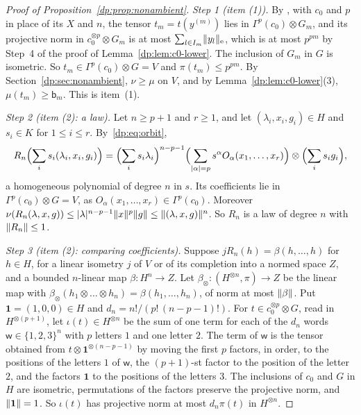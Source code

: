 \begin{proof}[Proof of Proposition~\ref{dp:prop:nonambient}]
\emph{Step 1 (item (1)).} By \cite[Lemma~Q.7(1)]{I}, with $c_0$ and $p$ in place of its $X$ and $n$, the tensor $t_m=t(y^{(m)})$ lies in $\Gamma^p(c_0)\otimes G_m$, and its projective norm in $c_0^{\otimes p}\otimes G_m$ is at most $\sum_{l\in I_m}\lVert y_l\rVert_{\rm e}$, which is at most $p^{pm}$ by Step~4 of the proof of Lemma~\ref{dp:lem:c0-lower}. The inclusion of $G_m$ in $G$ is isometric. So $t_m\in\Gamma^p(c_0)\otimes G=V$ and $\pi(t_m)\le p^{pm}$. By Section~\ref{dp:sec:nonambient}, $\nu\ge\mu$ on $V$, and by Lemma~\ref{dp:lem:c0-lower}(3), $\mu(t_m)\ge\mathsf b_m$. This is item~(1).

\emph{Step 2 (item (2): a law).} Let $n\ge p+1$ and $r\ge1$, and let $(\lambda_i,x_i,g_i)\in H$ and $s_i\in K$ for $1\le i\le r$. By~\eqref{dp:eq:orbit},
\[
 R_n\Bigl(\sum_is_i(\lambda_i,x_i,g_i)\Bigr)=\Bigl(\sum_is_i\lambda_i\Bigr)^{n-p-1}\Bigl(\sum_{\lvert \alpha\rvert=p}s^\alpha O_\alpha(x_1,\dots,x_r)\Bigr)\otimes\Bigl(\sum_is_ig_i\Bigr),
\]
a homogeneous polynomial of degree $n$ in $s$. Its coefficients lie in $\Gamma^p(c_0)\otimes G=V$, as $O_\alpha(x_1,\dots,x_r)\in\Gamma^p(c_0)$. Moreover $\nu(R_n(\lambda,x,g))\le\lvert \lambda\rvert^{n-p-1}\lVert x\rVert^p\lVert g\rVert\le\lVert (\lambda,x,g)\rVert^n$. So $R_n$ is a law of degree $n$ with $\lVert R_n\rVert\le1$.

\emph{Step 3 (item (2): comparing coefficients).} Suppose $jR_n(h)=\beta(h,\dots,h)$ for $h\in H$, for a linear isometry $j$ of $V$ or of its completion into a normed space $Z$, and a bounded $n$\nobreakdash-linear map $\beta\colon H^n\to Z$. Let $\beta_\otimes\colon(H^{\otimes n},\pi)\to Z$ be the linear map with $\beta_\otimes(h_1\otimes\dots\otimes h_n)=\beta(h_1,\dots,h_n)$, of norm at most $\lVert \beta\rVert$. Put $\mathbf 1=(1,0,0)\in H$ and $d_n=n!/(p!\,(n-p-1)!)$. For $t\in c_0^{\otimes p}\otimes G$, read in $H^{\otimes(p+1)}$, let $\iota(t)\in H^{\otimes n}$ be the sum of one term for each of the $d_n$ words $\mathsf w\in\{1,2,3\}^n$ with $p$ letters $1$ and one letter $2$. The term of $\mathsf w$ is the tensor obtained from $t\otimes\mathbf 1^{\otimes(n-p-1)}$ by moving the first $p$ factors, in order, to the positions of the letters $1$ of $\mathsf w$, the $(p+1)$-st factor to the position of the letter $2$, and the factors $\mathbf 1$ to the positions of the letters $3$. The inclusions of $c_0$ and $G$ in $H$ are isometric, permutations of the factors preserve the projective norm, and $\lVert \mathbf 1\rVert=1$. So $\iota(t)$ has projective norm at most $d_n\pi(t)$ in $H^{\otimes n}$.


\end{proof}
